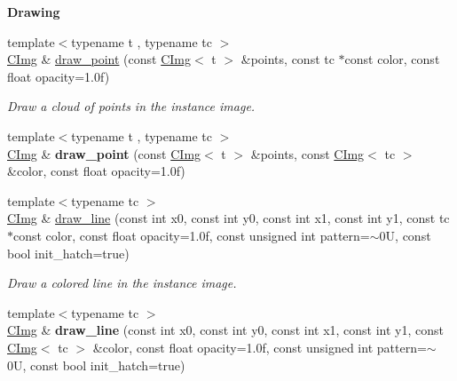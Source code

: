 \begin{Indent}{\bf Drawing}
\begin{DoxyCompactItemize}
\item 
{\footnotesize template$<$typename t , typename tc $>$ }\\\hyperlink{structcimg__library_1_1_c_img}{C\-Img} \& \hyperlink{structcimg__library_1_1_c_img_a11a161f13039f4e8c04f1a1e77ff7fc6}{draw\-\_\-point} (const \hyperlink{structcimg__library_1_1_c_img}{C\-Img}$<$ t $>$ \&points, const tc $\ast$const color, const float opacity=1.\-0f)
\begin{DoxyCompactList}\small\item\em Draw a cloud of points in the instance image. \end{DoxyCompactList}\item 
\hypertarget{structcimg__library_1_1_c_img_aad36d8fad5e70ec8ea39212840ecd4f0}{{\footnotesize template$<$typename t , typename tc $>$ }\\\hyperlink{structcimg__library_1_1_c_img}{C\-Img} \& {\bfseries draw\-\_\-point} (const \hyperlink{structcimg__library_1_1_c_img}{C\-Img}$<$ t $>$ \&points, const \hyperlink{structcimg__library_1_1_c_img}{C\-Img}$<$ tc $>$ \&color, const float opacity=1.\-0f)}\label{structcimg__library_1_1_c_img_aad36d8fad5e70ec8ea39212840ecd4f0}

\item 
{\footnotesize template$<$typename tc $>$ }\\\hyperlink{structcimg__library_1_1_c_img}{C\-Img} \& \hyperlink{structcimg__library_1_1_c_img_a1fe7b3d3438708eecd0978ee7df2db1b}{draw\-\_\-line} (const int x0, const int y0, const int x1, const int y1, const tc $\ast$const color, const float opacity=1.\-0f, const unsigned int pattern=$\sim$0\-U, const bool init\-\_\-hatch=true)
\begin{DoxyCompactList}\small\item\em Draw a colored line in the instance image. \end{DoxyCompactList}\item 
\hypertarget{structcimg__library_1_1_c_img_a0448158da2b4647b3e1dcb02dac0605d}{{\footnotesize template$<$typename tc $>$ }\\\hyperlink{structcimg__library_1_1_c_img}{C\-Img} \& {\bfseries draw\-\_\-line} (const int x0, const int y0, const int x1, const int y1, const \hyperlink{structcimg__library_1_1_c_img}{C\-Img}$<$ tc $>$ \&color, const float opacity=1.\-0f, const unsigned int pattern=$\sim$0\-U, const bool init\-\_\-hatch=true)}\label{structcimg__library_1_1_c_img_a0448158da2b4647b3e1dcb02dac0605d}


\end{DoxyCompactItemize}
\end{Indent}
